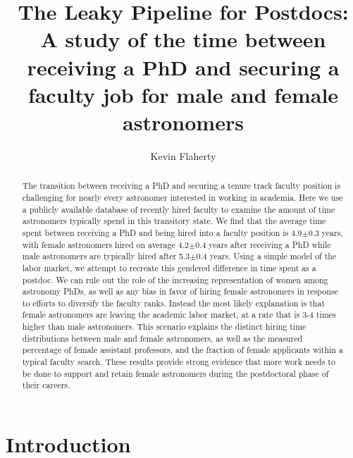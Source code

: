 \documentclass[modern]{aastex62}
\begin{document}
\title{The Leaky Pipeline for Postdocs: A study of the time between receiving a PhD and securing a faculty job for male and female astronomers}

\author[0000-0003-2657-1314]{Kevin Flaherty}

\begin{abstract}
The transition between receiving a PhD and securing a tenure track faculty position is challenging for nearly every astronomer interested in working in academia. Here we use a publicly available database of recently hired faculty to examine the amount of time astronomers typically spend in this transitory state. We find that the average time spent between receiving a PhD and being hired into a faculty position is 4.9$\pm$0.3 years, with female astronomers hired on average 4.2$\pm$0.4 years after receiving a PhD while male astronomers are typically hired after 5.3$\pm$0.4 years. Using a simple model of the labor market, we attempt to recreate this gendered difference in time spent as a postdoc. We can rule out the role of the increasing representation of women among astronomy PhDs, as well as any bias in favor of hiring female astronomers in response to efforts to diversify the faculty ranks. Instead the most likely explanation is that female astronomers are leaving the academic labor market, at a rate that is 3-4 times higher than male astronomers. This scenario explains the distinct hiring time distributions between male and female astronomers, as well as the measured percentage of female assistant professors, and the fraction of female applicants within a typical faculty search. These results provide strong evidence that more work needs to be done to support and retain female astronomers during the postdoctoral phase of their careers. 
\end{abstract}


\section{Introduction}
\end{document}
